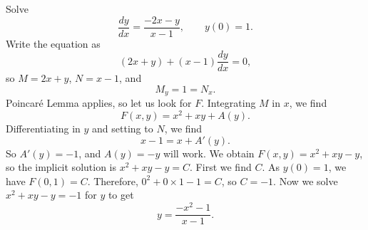 \begin{example} \label{exact:exactR2example}
Solve
\begin{equation*}
\frac{dy}{dx} = \frac{-2x-y}{x-1}, \qquad y(0) = 1.
\end{equation*}
Write the equation as
\begin{equation*}
(2x+y) + (x-1)\frac{dy}{dx} = 0 ,
\end{equation*}
so $M = 2x+y$, $N = x-1$, and
\begin{equation*}
M_y = 1 = N_x .
\end{equation*}
Poincar\'e Lemma applies, so let us look for $F$.
Integrating $M$ in $x$, we find
\begin{equation*}
F(x,y) = x^2+xy + A(y) .
\end{equation*}
Differentiating in $y$ and setting to $N$, we find
\begin{equation*}
x-1 = x + A'(y) .
\end{equation*}
So $A'(y) = -1$, and $A(y) = -y$ will work.  We obtain $F(x,y) = x^2+xy-y$, so
the implicit solution is $x^2+xy-y = C$.  First we find $C$.  As $y(0)=1$, we have
$F(0,1) = C$.  Therefore, $0^2+0\times 1 - 1 = C$, so $C=-1$.  Now we solve
$x^2+xy-y = -1$ for $y$ to get
\begin{equation*}
y = \frac{-x^2-1}{x-1} .
\end{equation*}
\end{example}

